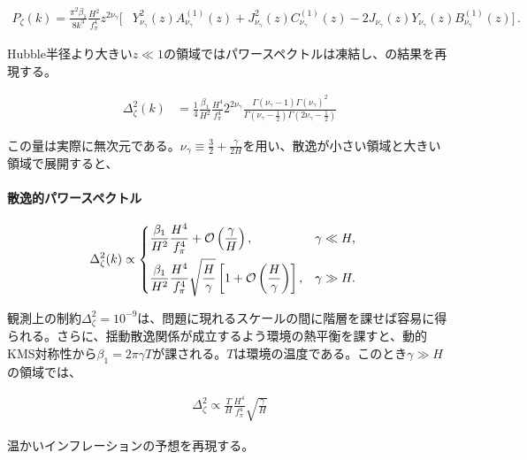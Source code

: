 \documentclass[a4paper,11pt]{ltjsarticle}
\numberwithin{equation}{section}
\begin{document}
\begin{align}\label{eq:PKref}
P_\zeta(k) = \frac{\pi^2\beta_1}{8 k^3}  \frac{H^2}{f_\pi^4} z^{2{\nu_\gamma}} \Big[& Y^2_{\nu_\gamma}(z)  A^{(1)}_{\nu_\gamma}(z) + J^2_{\nu_\gamma}(z) C^{(1)}_{\nu_\gamma}(z) -2J_{\nu_\gamma}(z)Y_{\nu_\gamma}(z) B^{(1)}_{\nu_\gamma}(z) \Big]\,.
\end{align}

Hubble半径より大きい$z\ll1$の領域ではパワースペクトルは凍結し、\cite{Creminelli:2023aly}の結果を再現する。

\begin{align}
\Delta^2_\zeta(k) &= \frac{1}{4} \frac{\beta_1}{H^2}   \frac{H^4}{f_\pi^4}  2^{2\nu_\gamma} \frac{\Gamma\left(\nu_\gamma-1\right)\Gamma\left(\nu_\gamma\right)^2}{\Gamma\left(\nu_\gamma - \frac{1}{2}\right)\Gamma\left(2\nu_\gamma - \frac{1}{2}\right)}\label{eq:PK1SH}
\end{align}

この量は実際に無次元である。$\nu_\gamma\equiv\frac32+\frac{\gamma}{2H}$を用い、散逸が小さい領域と大きい領域で展開すると、
\begin{tcolorbox}[enhanced,breakable,skin first=enhanced,skin middle=enhanced,skin last=enhanced,before upper={\parindent15pt},]{}

\paragraph{散逸的パワースペクトル}

\begin{align}\label{eq:dissipPk}
    \Delta^2_\zeta(k)  &\propto  \begin{dcases}
 \frac{\beta_1}{H^2} \frac{H^4}{f_\pi^4}  + \mathcal{O}\left(\frac{\gamma}{H}\right), & \gamma \ll H,\\
 \frac{\beta_1}{H^2} \frac{H^4}{f_\pi^4}   \sqrt{\frac{H}{\gamma}} \left[1 + \mathcal{O}\left(\frac{H}{\gamma}\right) \right], & \gamma \gg H.
\end{dcases}
\end{align}

観測上の制約$\Delta_\zeta^2=10^{-9}$は、問題に現れるスケールの間に階層を課せば容易に得られる。さらに、揺動散逸関係が成立するよう環境の熱平衡を課すと、動的KMS対称性から$\beta_1=2\pi\gamma T$が課される。$T$は環境の温度である\cite{Hongo:2018ant}。このとき$\gamma\gg H$の領域では、

\begin{align}
    \Delta^2_\zeta \propto \frac{T}{H}\frac{H^4}{f_\pi^4} \sqrt{\frac{\gamma}{H}}
\end{align}

温かいインフレーションの予想\cite{Berera:1995ie,Berera:1995wh,Berera:1999ws,Berera:2008ar,Ballesteros:2023dno,Montefalcone:2023pvh}を再現する。
\end{tcolorbox}
\end{document}
